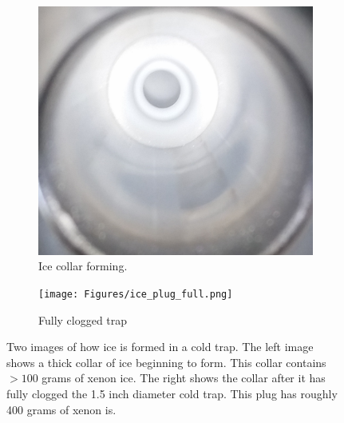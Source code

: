 \begin{figure}[h!]
\centering
\begin{subfigure}{0.45\textwidth}
  \centering
  \includegraphics[width=\textwidth]{Figures/ice_plug_start.png}
  \caption{Ice collar forming.}
  \label{fig:plugstart}
\end{subfigure}\hfill%
\begin{subfigure}{0.45\textwidth}
  \centering
  \texttt{[image: Figures/ice\_plug\_full.png]}
  \caption{Fully clogged trap}
  \label{fig:plugfull}
\end{subfigure}
\caption{Two images of how ice is formed in a cold trap. The left image shows a thick collar of ice beginning to form. This collar contains $>100$ grams of xenon ice. The right shows the collar after it has fully clogged the 1.5 inch diameter cold trap. This plug has roughly 400 grams of xenon is.} 
\label{fig:iceplug}
\end{figure}


